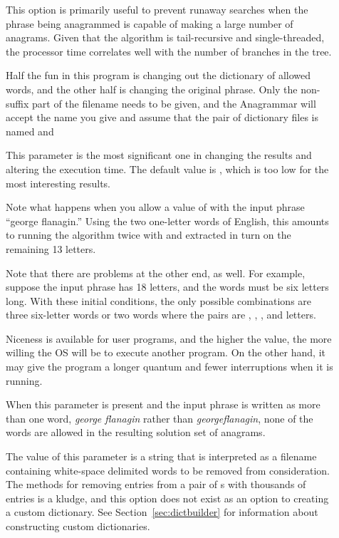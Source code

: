 \documentclass[letterpaper, 11pt]{article}
\begin{document}
\begin{description}
\item[] This option is primarily useful to prevent runaway searches
when the phrase being anagrammed is capable of making a large number of 
anagrams. Given that the algorithm is tail-recursive and single-threaded,
the processor time correlates well with the number of branches in the
tree.

\item[] Half the fun in this program is changing out
the dictionary of allowed words, and the other half is changing the
original phrase. Only the non-suffix part of the filename needs to
be given, and the Anagrammar will accept the name you give and assume
that the pair of dictionary files is named  and 
 
\item[] This parameter is the most significant one in
changing the results and altering the execution time. The default
value is , which is too low for the most interesting results. 

Note what happens when you allow a value of  with the input
phrase ``george flanagin.'' Using the two one-letter words of English,
this amounts to running the algorithm twice with  and  
extracted in turn on the remaining 13 letters. 

Note that there are problems at the other end, as well. For example,
suppose the input phrase has 18 letters, and the words must be six letters
long. With these initial conditions, the only possible combinations are three six-letter words
or two words where the pairs are , , , and  letters.

\item[] Niceness is available for user programs, and the
higher the value, the more willing the OS will be to execute another
program. On the other hand, it may give the program a longer quantum and
fewer interruptions when it is running. 

\item[] When this parameter is present and the input
phrase is written as more than one word, \ie \emph{george flanagin} 
rather than \emph{georgeflanagin}, none of the words are allowed 
in the resulting solution set of anagrams.

\item[] The value of this parameter is a string that
is interpreted as a filename containing white-space delimited words to
be removed from consideration. The methods for removing entries from
a pair of s with thousands of entries is a kludge, and this 
option does not exist as an option to creating a custom dictionary.
See Section~\ref{sec:dictbuilder} for information about constructing
custom dictionaries.


\end{description}
\end{document}
